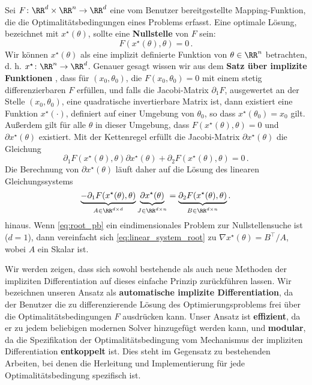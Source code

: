 Sei $F \colon \RR^d \times \RR^n \to \RR^d$ eine vom Benutzer bereitgestellte Mapping-Funktion, die die Optimalitätsbedingungen eines Problems erfasst. Eine optimale Lösung, bezeichnet mit $x^\star(\theta)$, sollte eine \textbf{Nullstelle} von $F$ sein:
\begin{equation}
F(x^\star(\theta), \theta) = 0\,.
\label{eq:root_pb}
\end{equation}
Wir können $x^\star(\theta)$ als eine implizit definierte Funktion von $\theta \in \RR^n$ betrachten, d. h. $x^\star \colon \RR^n \to \RR^d$.
Genauer gesagt wissen wir aus dem \textbf{Satz über implizite Funktionen} \cite{griewank_2008,krantz_2012}, dass für $(x_0, \theta_0)$, die $F(x_0, \theta_0) = 0$ mit einem stetig differenzierbaren $F$ erfüllen, und falls die Jacobi-Matrix $\partial_1 F$, ausgewertet an der Stelle $(x_0, \theta_0)$, eine quadratische invertierbare Matrix ist, dann existiert eine Funktion $x^\star(\cdot)$, definiert auf einer Umgebung von $\theta_0$, so dass $x^\star(\theta_0) = x_0$ gilt. Außerdem gilt für alle $\theta$ in dieser Umgebung, dass $F(x^\star(\theta), \theta) = 0$ und $\partial x^\star(\theta)$ existiert.
Mit der Kettenregel erfüllt die Jacobi-Matrix $\partial x^\star(\theta)$ die Gleichung
\begin{equation}
\partial_1 F(x^\star(\theta), \theta) \partial x^\star(\theta) + 
\partial_2 F(x^\star(\theta), \theta) = 0\,.
\end{equation}
Die Berechnung von $\partial x^\star(\theta)$ läuft daher auf die Lösung des linearen Gleichungssystems
\begin{equation}
\underbrace{-\partial_1 F(x^\star(\theta), \theta)}_{A \in \RR^{d \times d}} 
\underbrace{\partial x^\star(\theta)}_{J \in \RR^{d \times n}}
= \underbrace{\partial_2 F(x^\star(\theta), \theta)}_{B \in \RR^{d \times n}}.
\label{eq:linear_system_root}
\end{equation}
hinaus. Wenn \eqref{eq:root_pb} ein eindimensionales Problem zur Nullstellensuche ist ($d=1$), dann vereinfacht sich \eqref{eq:linear_system_root} zu $\nabla x^\star(\theta) = B^\top / A$, wobei $A$ ein Skalar ist.

Wir werden zeigen, dass sich sowohl bestehende als auch neue Methoden der impliziten Differentiation auf dieses einfache Prinzip zurückführen lassen.
Wir bezeichnen unseren Ansatz als \textbf{automatische implizite Differentiation}, da der Benutzer die zu differenzierende Lösung des Optimierungsproblems frei über die Optimalitätsbedingungen $F$ ausdrücken kann. Unser Ansatz ist \textbf{effizient}, da er zu jedem beliebigen modernen Solver hinzugefügt werden kann, und \textbf{modular}, da die Spezifikation der Optimalitätsbedingung vom Mechanismus der impliziten Differentiation \textbf{entkoppelt} ist.
Dies steht im Gegensatz zu bestehenden Arbeiten, bei denen die Herleitung und Implementierung für jede Optimalitätsbedingung spezifisch ist.

